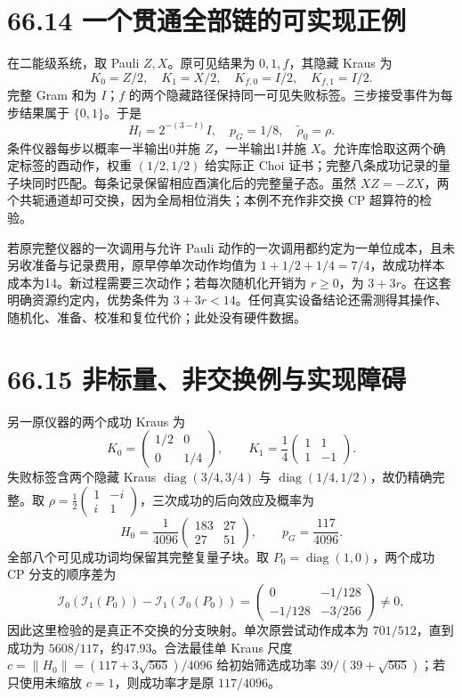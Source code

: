 \documentclass[
  11pt,
  oneside]{book}
\begin{document}
\section{66.14 一个贯通全部链的可实现正例}

在二能级系统，取 Pauli \(Z,X\)。原可见结果为 \(0,1,f\)，其隐藏 Kraus 为
\[
K_0=Z/2,\quad K_1=X/2,\quad
K_{f,0}=I/2,\quad K_{f,1}=I/2.
\] 完整 Gram 和为 \(I\)；\(f\)
的两个隐藏路径保持同一可见失败标签。三步接受事件为每步结果属于
\(\{0,1\}\)。于是 \[
H_t=2^{-(3-t)}I,\quad p_G=1/8,\quad\widetilde\rho_0=\rho.
\] 条件仪器每步以概率一半输出0并施 \(Z\)，一半输出1并施
\(X\)。允许库恰取这两个确定标签的酉动作，权重 \((1/2,1/2)\) 给实际正
Choi
证书；完整八条成功记录的量子块同时匹配。每条记录保留相应酉演化后的完整量子态。虽然
\(XZ=-ZX\)，两个共轭通道却可交换，因为全局相位消失；本例不充作非交换 CP
超算符的检验。

若原完整仪器的一次调用与允许 Pauli
动作的一次调用都约定为一单位成本，且未另收准备与记录费用，原早停单次动作均值为
\(1+1/2+1/4=7/4\)，故成功样本成本为14。新过程需要三次动作；若每次随机化开销为
\(r\ge0\)，为 \(3+3r\)。在这套明确资源约定内，优势条件为
\(3+3r<14\)。任何真实设备结论还需测得其操作、随机化、准备、校准和复位代价；此处没有硬件数据。

\section{66.15 非标量、非交换例与实现障碍}

另一原仪器的两个成功 Kraus 为 \[
K_0=\begin{pmatrix}1/2&0\\0&1/4\end{pmatrix},\qquad
K_1=\frac14\begin{pmatrix}1&1\\1&-1\end{pmatrix}.
\] 失败标签含两个隐藏 Kraus \(\operatorname{diag}(3/4,3/4)\) 与
\(\operatorname{diag}(1/4,1/2)\)，故仍精确完整。取
\(\rho=\frac12\begin{pmatrix}1&-i\\i&1\end{pmatrix}\)，三次成功的后向效应及概率为
\[
H_0=\frac1{4096}\begin{pmatrix}183&27\\27&51\end{pmatrix},\qquad
p_G=\frac{117}{4096}.
\] 全部八个可见成功词均保留其完整复量子块。取
\(P_0=\operatorname{diag}(1,0)\)，两个成功 CP 分支的顺序差为 \[
\mathcal I_0(\mathcal I_1(P_0))-\mathcal I_1(\mathcal I_0(P_0))
=\begin{pmatrix}0&-1/128\\-1/128&-3/256\end{pmatrix}\ne0,
\] 因此这里检验的是真正不交换的分支映射。单次原尝试动作成本为
\(701/512\)，直到成功为 \(5608/117\)，约47.93。合法最佳单 Kraus 尺度
\(c=\|H_0\|=(117+3\sqrt{565})/4096\) 给初始筛选成功率
\(39/(39+\sqrt{565})\)；若只使用未缩放 \(c=1\)，则成功率才是原
\(117/4096\)。
\end{document}
